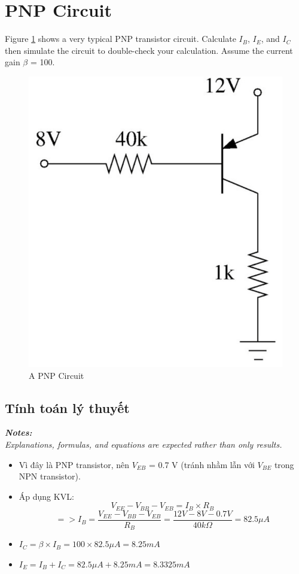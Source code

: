 \section{PNP Circuit}
Figure \ref{lab3_ex6_de} shows a very typical PNP transistor circuit.
Calculate $I_B$, $I_E$, and $I_C$ then simulate the circuit to double-check your calculation. Assume the current gain $\beta$ = 100.

\begin{figure}[H]
    \centering
    \includegraphics[width=0.5\linewidth]{graphics/ex6/f1.png}
    \caption{A PNP Circuit}
    \label{lab3_ex6_de}
\end{figure}

\subsection{Tính toán lý thuyết}
\textit{\textbf{Notes:}}\\
\textit{Explanations, formulas, and equations are expected rather than only results.}

\begin{itemize}
    \item Vì đây là PNP transistor, nên $V_{EB}$ = 0.7 V (tránh nhầm lẫn với $V_{BE}$ trong NPN transistor).
    \item Áp dụng KVL: $$V_{EE} - V_{BB} - V_{EB} = I_B \times R_B $$
    $$ => I_B = \frac{V_{EE} - V_{BB} - V_{EB}}{R_B} = \frac{12V - 8V - 0.7V}{40k \Omega} = 82.5 \mu A $$
    \item $I_C = \beta \times I_B = 100 \times 82.5 \mu A = 8.25 mA $
    \item $I_E = I_B + I_C = 82.5\mu A + 8.25mA = 8.3325 mA$
\end{itemize}

